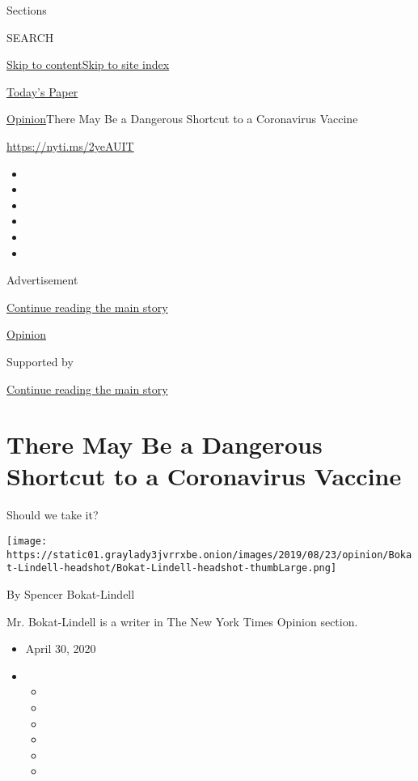 Sections

SEARCH

\protect\hyperlink{site-content}{Skip to
content}\protect\hyperlink{site-index}{Skip to site index}

\href{https://myaccount.nytimes3xbfgragh.onion/auth/login?response_type=cookie\&client_id=vi}{}

\href{https://www.nytimes3xbfgragh.onion/section/todayspaper}{Today's
Paper}

\href{/section/opinion}{Opinion}\textbar{}There May Be a Dangerous
Shortcut to a Coronavirus Vaccine

\url{https://nyti.ms/2yeAUIT}

\begin{itemize}
\item
\item
\item
\item
\item
\item
\end{itemize}

Advertisement

\protect\hyperlink{after-top}{Continue reading the main story}

\href{/section/opinion}{Opinion}

Supported by

\protect\hyperlink{after-sponsor}{Continue reading the main story}

\hypertarget{there-may-be-a-dangerous-shortcut-to-a-coronavirus-vaccine}{%
\section{There May Be a Dangerous Shortcut to a Coronavirus
Vaccine}\label{there-may-be-a-dangerous-shortcut-to-a-coronavirus-vaccine}}

Should we take it?

\texttt{[image: https://static01.graylady3jvrrxbe.onion/images/2019/08/23/opinion/Bokat-Lindell-headshot/Bokat-Lindell-headshot-thumbLarge.png]}

By Spencer Bokat-Lindell

Mr. Bokat-Lindell is a writer in The New York Times Opinion section.

\begin{itemize}
\item
  April 30, 2020
\item
  \begin{itemize}
  \item
  \item
  \item
  \item
  \item
  \item
  \end{itemize}
\end{itemize}

